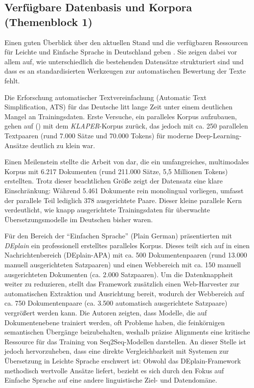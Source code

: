 \label{sec:stand_der_forschung}

\subsection{Verfügbare Datenbasis und Korpora (Themenblock 1)}
\label{sec:datenbasis_korpora}

Einen guten Überblick über den aktuellen Stand und die verfügbaren Ressourcen für Leichte und Einfache Sprache in Deutschland geben \citet{madina2023easy}. Sie zeigen dabei vor allem auf, wie unterschiedlich die bestehenden Datensätze strukturiert sind und dass es an standardisierten Werkzeugen zur automatischen Bewertung der Texte fehlt.

Die Erforschung automatischer Textvereinfachung (Automatic Text Simplification, ATS) für das Deutsche litt lange Zeit unter einem deutlichen Mangel an Trainingsdaten. Erste Versuche, ein paralleles Korpus aufzubauen, gehen auf \citeauthor{klaper2013klaper} (\citeyear{klaper2013klaper}) mit dem \textit{KLAPER}-Korpus zurück, das jedoch mit ca. 250 parallelen Textpaaren (rund 7.000 Sätze und 70.000 Tokens) für moderne Deep-Learning-Ansätze deutlich zu klein war. 

Einen Meilenstein stellte die Arbeit von \citet{battisti2020corpus} dar, die ein umfangreiches, multimodales Korpus mit 6.217 Dokumenten (rund 211.000 Sätze, 5,5 Millionen Tokens) erstellten. Trotz dieser beachtlichen Größe zeigt der Datensatz eine klare Einschränkung: Während 5.461 Dokumente rein monolingual vorliegen, umfasst der parallele Teil lediglich 378 ausgerichtete Paare. Dieser kleine parallele Kern verdeutlicht, wie knapp ausgerichtete Trainingsdaten für überwachte Übersetzungsmodelle im Deutschen bisher waren.

Für den Bereich der "`Einfachen Sprache"' (Plain German) präsentierten \citet{stodden2023deplain} mit \textit{DEplain} ein professionell erstelltes paralleles Korpus. Dieses teilt sich auf in einen Nachrichtenbereich (DEplain-APA) mit ca. 500 Dokumentenpaaren (rund 13.000 manuell ausgerichteten Satzpaaren) und einen Webbereich mit ca. 150 manuell ausgerichteten Dokumenten (ca. 2.000 Satzpaaren). Um die Datenknappheit weiter zu reduzieren, stellt das Framework zusätzlich einen Web-Harvester zur automatischen Extraktion und Ausrichtung bereit, wodurch der Webbereich auf ca. 750 Dokumentenpaare (ca. 3.500 automatisch ausgerichtete Satzpaare) vergrößert werden kann. Die Autoren zeigten, dass Modelle, die auf Dokumentenebene trainiert werden, oft Probleme haben, die feinkörnigen semantischen Übergänge beizubehalten, weshalb präzise Alignments eine kritische Ressource für das Training von Seq2Seq-Modellen darstellen. An dieser Stelle ist jedoch hervorzuheben, dass eine direkte Vergleichbarkeit mit Systemen zur Übersetzung in Leichte Sprache erschwert ist: Obwohl das DEplain-Framework methodisch wertvolle Ansätze liefert, bezieht es sich durch den Fokus auf Einfache Sprache auf eine andere linguistische Ziel- und Datendomäne.

